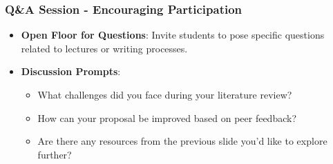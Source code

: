 \documentclass[aspectratio=169]{beamer}
\begin{document}
\begin{frame}[fragile]
    \frametitle{Q\&A Session - Encouraging Participation}
    \begin{itemize}
        \item \textbf{Open Floor for Questions}:  
        Invite students to pose specific questions related to lectures or writing processes.
        
        \item \textbf{Discussion Prompts}:
        \begin{itemize}
            \item What challenges did you face during your literature review?
            \item How can your proposal be improved based on peer feedback?
            \item Are there any resources from the previous slide you'd like to explore further?
        \end{itemize}
    \end{itemize}
\end{frame}
\end{document}
